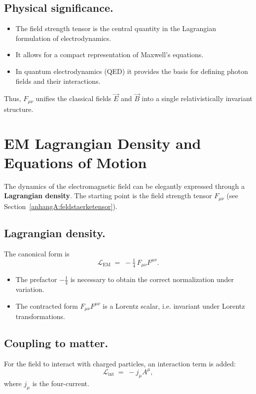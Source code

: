 \subsection*{Physical significance.}
\begin{itemize}
	\item The field strength tensor is the central quantity in the 
	Lagrangian formulation of electrodynamics.
	\item It allows for a compact representation of Maxwell’s equations.
	\item In quantum electrodynamics (QED) it provides the basis 
	for defining photon fields and their interactions.
\end{itemize}

\medskip
Thus, \( F_{\mu\nu} \) unifies the classical fields \( \vec{E} \) and \( \vec{B} \)
into a single relativistically invariant structure.

\section{EM Lagrangian Density and Equations of Motion}
\label{anhangA:lagrange_em}

The dynamics of the electromagnetic field can be elegantly expressed 
through a \textbf{Lagrangian density}. 
The starting point is the field strength tensor \( F_{\mu\nu} \) 
(see Section~\ref{anhangA:feldstaerketensor}).

\subsection*{Lagrangian density.}
The canonical form is
\[
\mathcal{L}_{\text{EM}} \;=\; -\tfrac{1}{4} \, F_{\mu\nu} F^{\mu\nu}.
\]

\begin{itemize}
	\item The prefactor \(-\tfrac{1}{4}\) is necessary to obtain the correct normalization 
	under variation.
	\item The contracted form \(F_{\mu\nu} F^{\mu\nu}\) 
	is a Lorentz scalar, i.e. invariant under Lorentz transformations.
\end{itemize}

\subsection*{Coupling to matter.}
For the field to interact with charged particles, 
an interaction term is added:
\[
\mathcal{L}_{\text{int}} \;=\; - j_\mu A^\mu ,
\]
where \( j_\mu \) is the four-current.

